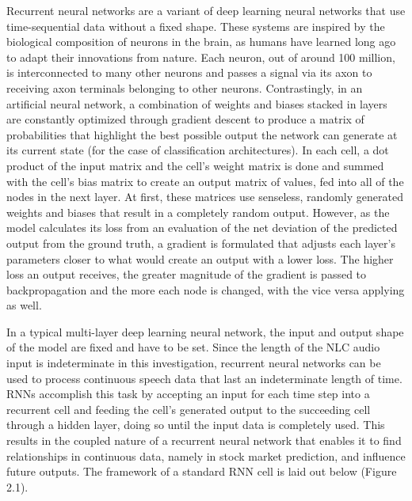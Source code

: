 Recurrent neural networks are a variant of deep learning neural networks that use time-sequential data without a fixed shape. These systems are inspired by the biological composition of neurons in the brain, as humans have learned long ago to adapt their innovations from nature. Each neuron, out of around 100 million, is interconnected to many other neurons and passes a signal via its axon to receiving axon terminals belonging to other neurons. Contrastingly, in an artificial neural network, a combination of weights and biases stacked in layers are constantly optimized through gradient descent to produce a matrix of probabilities that highlight the best possible output the network can generate at its current state (for the case of classification architectures). In each cell, a dot product of the input matrix and the cell’s weight matrix is done and summed with the cell’s bias matrix to create an output matrix of values, fed into all of the nodes in the next layer. At first, these matrices use senseless, randomly generated weights and biases that result in a completely random output. However, as the model calculates its loss from an evaluation of the net deviation of the predicted output from the ground truth, a gradient is formulated that adjusts each layer’s parameters closer to what would create an output with a lower loss. The higher loss an output receives, the greater magnitude of the gradient is passed to backpropagation and the more each node is changed, with the vice versa applying as well.
\newline\par
In a typical multi-layer deep learning neural network, the input and output shape of the model are fixed and have to be set. Since the length of the NLC audio input is indeterminate in this investigation, recurrent neural networks can be used to process continuous speech data that last an indeterminate length of time. RNNs accomplish this task by accepting an input for each time step into a recurrent cell and feeding the cell’s generated output to the succeeding cell through a hidden layer, doing so until the input data is completely used. This results in the coupled nature of a recurrent neural network that enables it to find relationships in continuous data, namely in stock market prediction, and influence future outputs. The framework of a standard RNN cell is laid out below (Figure 2.1).

